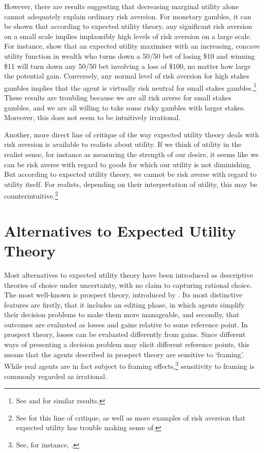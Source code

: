 However, there are results suggesting that decreasing marginal utility alone cannot adequately explain ordinary risk aversion. For monetary gambles, it can be shown that according to expected utility theory, any significant risk aversion on a small scale implies implausibly high levels of risk aversion on a large scale. For instance, \citet{RabinThaler2001} show that an expected utility maximiser with an increasing, concave utility function in wealth who turns down a 50/50 bet of losing \$10 and winning \$11 will turn down any 50/50 bet involving a loss of \$100, no matter how large the potential gain. Conversely, any normal level of risk aversion for high stakes gambles implies that the agent is virtually risk neutral for small stakes gambles.\footnote{See \citet{Samuelson1963} and \citet{Rabin2000} for similar results.} These results are troubling because we are all risk averse for small stakes gambles, and we are all willing to take some risky gambles with larger stakes. Moreover, this does not seem to be intuitively irrational.

Another, more direct line of critique of the way expected utility theory deals with risk aversion is available to realists about utility. If we think of utility in the realist sense, for instance as measuring the strength of our desire, it seems like we can be risk averse with regard to goods for which our utility is not diminishing. But according to expected utility theory, we cannot be risk averse with regard to utility itself. For realists, depending on their interpretation of utility, this may be counterintuitive.\footnote{See \citet{Buchak2013} for this line of critique, as well as more examples of risk aversion that expected utility has trouble making sense of.}

\section{Alternatives to Expected Utility Theory}\label{s6}

Most alternatives to expected utility theory have been introduced as descriptive theories of choice under uncertainty, with no claim to capturing rational choice. The most well-known is prospect theory, introduced by \citet{KahnemanTversky1979}. Its most distinctive features are firstly, that it includes an editing phase, in which agents simplify their decision problems to make them more manageable, and secondly, that outcomes are evaluated as losses and gains relative to some reference point. In prospect theory, losses can be evaluated differently from gains. Since different ways of presenting a decision problem may elicit different reference points, this means that the agents described in prospect theory are sensitive to `framing'. While real agents are in fact subject to framing effects,\footnote{See, for instance, \citet{TverskyKahneman1981}.} sensitivity to framing is commonly regarded as irrational.

